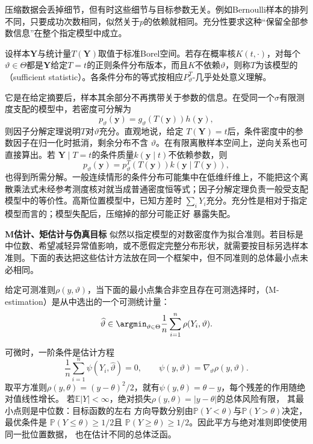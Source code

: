 压缩数据会丢掉细节，但有时这些细节与目标参数无关。例如Bernoulli样本的排列不同，只要成功次数相同，似然关于\(p\)的依赖就相同。充分性要求这种“保留全部参数信息”在整个指定模型中成立。
\begin{definition}[充分统计量]
  \label{def:statistics-sufficient-statistic}
  设样本\(\bm Y\)与统计量\(T(\bm Y)\)取值于标准Borel空间。若存在概率核\(K(t,\cdot)\)，对每个\(\vartheta\in\Theta\)都是\(\bm Y\)给定\(T=t\)的正则条件分布版本，而且\(K\)不依赖\(\vartheta\)，则称\(T\)为该模型的（sufficient statistic）。各条件分布的等式按相应\(P_\vartheta^T\)-几乎处处意义理解。
\end{definition}
它是在给定摘要后，样本其余部分不再携带关于参数的信息。在受同一个\(\sigma\)有限测度支配的模型中，若密度可分解为
\[
  p_\vartheta(\bm y)=g_\vartheta(T(\bm y))h(\bm y),
\]
则因子分解定理说明\(T\)对\(\vartheta\)充分。直观地说，给定
\(T(\bm Y)=t\)后，条件密度中的参数因子在归一化时抵消，剩余分布不含
\(\vartheta\)。在有限离散样本空间上，逆向关系也可直接算出。若
\(\bm Y\mid T=t\)的条件质量\(k(\bm y\mid t)\)不依赖参数，则
\[
  p_\vartheta(\bm y)
  =p_\vartheta^T(T(\bm y))k(\bm y\mid T(\bm y)),
\]
也得到所需分解。一般连续情形的条件分布可能集中在低维纤维上，不能把这个离散乘法式未经参考测度核对就当成普通密度恒等式；因子分解定理负责一般受支配模型中的等价性。高斯位置模型中，已知方差时
\(\sum_iY_i\)充分。充分性是相对于指定模型而言的；模型失配后，压缩掉的部分可能正好
暴露失配。

\par\medskip\noindent\textbf{M估计、矩估计与伪真目标}\quad
似然以指定模型的对数密度作为拟合准则。若目标是中位数、希望减轻异常值影响，或不愿假定完整分布形状，就需要按目标另选样本准则。下面的表达把这些估计方法放在同一个框架中，但不同准则的总体最小点未必相同。
\begin{definition}[M估计]
  \label{def:statistics-m-estimator}
给定可测准则\(\rho(y,\vartheta)\)，当下面的最小点集合非空且存在可测选择时，（M-estimation）是从中选出的一个可测统计量：
\[
  \widehat\vartheta
  \in\argmin_{\vartheta\in\Theta}
  \frac1n\sum_{i=1}^n\rho(Y_i,\vartheta).
\]
\end{definition}
可微时，一阶条件是估计方程
\[
  \frac1n\sum_{i=1}^n\psi(Y_i,\widehat\vartheta)=0,
  \qquad
  \psi(y,\vartheta)=\nabla_\vartheta\rho(y,\vartheta).
\]
取平方准则\(\rho(y,\theta)=(y-\theta)^2/2\)，就有\(\psi(y,\theta)=\theta-y\)，每个残差的作用随绝对值线性增长。
若\(\mathbb E|Y|<\infty\)，绝对损失\(\rho(y,\theta)=|y-\theta|\)的总体风险有限，
其最小点则是中位数：目标函数的左右
方向导数分别由\(\mathbb{P}(Y<\theta)\)与\(\mathbb{P}(Y>\theta)\)决定，最优条件是
\(\mathbb{P}(Y\leq\theta)\geq1/2\)且
\(\mathbb{P}(Y\geq\theta)\geq1/2\)。因此平方与绝对准则即使使用同一批位置数据，
也在估计不同的总体泛函。


